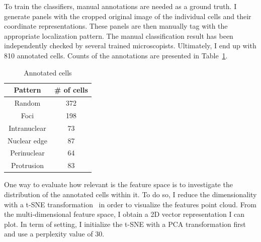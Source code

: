 To train the classifiers, manual annotations are needed as a ground truth.
I generate panels with the cropped original image of the individual cells and their coordinate representations.
These panels are then manually tag with the appropriate localization pattern.
The manual classification result has been independently checked by several trained microscopists.
Ultimately, I end up with 810 annotated cells.
Counts of the annotations are presented in Table~\ref{table:real_dataset_chapter5}.

\begin{table}
	\centering
	\begin{tabular}{| c | c |}
		\hline
		Pattern & \# of cells \\
		\hline
		Random & 372\\
		Foci & 198\\
		Intranuclear & 73\\
		Nuclear edge & 87\\
		Perinuclear & 64\\
		Protrusion & 83\\
		\hline
	\end{tabular}
	\caption{Annotated cells}
	\label{table:real_dataset_chapter5}
\end{table}

One way to evaluate how relevant is the feature space is to investigate the distribution of the annotated cells within it.
To do so, I reduce the dimensionality with a \ac{t-SNE} transformation~\cite{vandermaaten_2008} in order to visualize the features point cloud.
From the multi-dimensional feature space, I obtain a 2D vector representation I can plot.
In term of setting, I initialize the \ac{t-SNE} with a PCA transformation first and use a perplexity value of 30.

